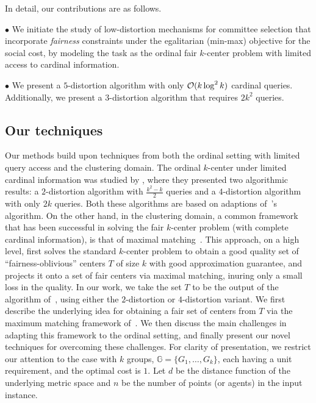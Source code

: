 In detail, our contributions are as follows.

$\bullet$ We initiate the study of low-distortion mechanisms for committee selection that incorporate \emph{fairness} constraints under the egalitarian (min-max) objective for the social cost, by modeling the task as the ordinal fair $k$-center problem with limited access to cardinal information. 

$\bullet$ We present a $5$-distortion algorithm with only $\mathcal{O}(k \log ^2 k)$ cardinal queries. 
Additionally, we present a $3$-distortion algorithm that requires $2k^2$ queries. 

\subsection{Our techniques}
Our methods build upon techniques from both the ordinal setting with limited query access and the clustering domain.
The ordinal $k$-center under limited cardinal information was studied by
\citet{burkhardt2024low}, where they presented two algorithmic results: a $2$-distortion algorithm with $\frac{k^2-k}{2}$ queries and a $4$-distortion algorithm with only $2k$ queries. Both these algorithms are based on adaptions of~\citet{gonzalez1985clustering}'s algorithm.
On the other hand, in the clustering domain,
a common framework that has been successful in solving the fair $k$-center problem (with complete cardinal information), is that of maximal matching~\cite{jones2020fair,gadekar2025fair}.
This approach, on a high level,  first solves the standard $k$-center problem to obtain a good quality set of ``fairness-oblivious'' centers $T$ of size $k$ with good approximation guarantee, and
projects it onto a set of fair centers via maximal matching, inuring only a small loss in the quality.
In our work, we take the set $T$ to be the output of the algorithm of~\cite{burkhardt2024low}, using either the $2$-distortion or $4$-distortion variant. We first describe the underlying idea for obtaining a fair set of centers from $T$ via the maximum matching framework of~\cite{jones2020fair,gadekar2025fair}. We then discuss the main challenges in adapting this framework to the ordinal setting, and finally present our novel techniques for overcoming these challenges.
For clarity of presentation, we restrict our attention to the case with $k$ groups, $\mathbb{G}=\{G_1,\dots,G_k\}$, each having a unit requirement, and the optimal cost is $1$. 
Let $d$ be the distance function of the underlying metric space and $n$ be the number of points (or agents) in the input instance.

